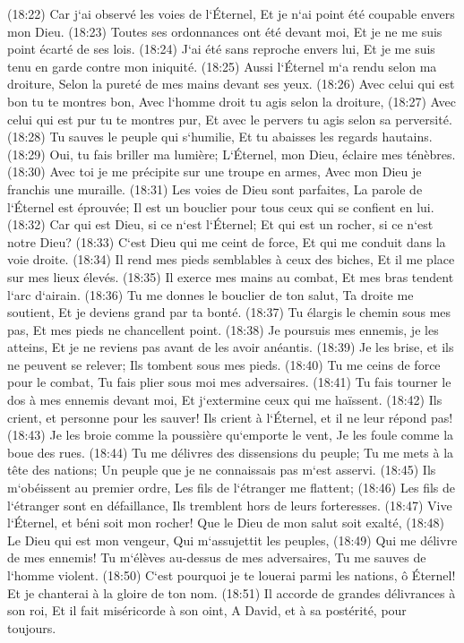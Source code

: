 \verse (18:22) Car j`ai observé les voies de l`Éternel, Et je n`ai point été coupable envers mon Dieu. 
\verse (18:23) Toutes ses ordonnances ont été devant moi, Et je ne me suis point écarté de ses lois. 
\verse (18:24) J`ai été sans reproche envers lui, Et je me suis tenu en garde contre mon iniquité. 
\verse (18:25) Aussi l`Éternel m`a rendu selon ma droiture, Selon la pureté de mes mains devant ses yeux. 
\verse (18:26) Avec celui qui est bon tu te montres bon, Avec l`homme droit tu agis selon la droiture, 
\verse (18:27) Avec celui qui est pur tu te montres pur, Et avec le pervers tu agis selon sa perversité. 
\verse (18:28) Tu sauves le peuple qui s`humilie, Et tu abaisses les regards hautains. 
\verse (18:29) Oui, tu fais briller ma lumière; L`Éternel, mon Dieu, éclaire mes ténèbres. 
\verse (18:30) Avec toi je me précipite sur une troupe en armes, Avec mon Dieu je franchis une muraille. 
\verse (18:31) Les voies de Dieu sont parfaites, La parole de l`Éternel est éprouvée; Il est un bouclier pour tous ceux qui se confient en lui. 
\verse (18:32) Car qui est Dieu, si ce n`est l`Éternel; Et qui est un rocher, si ce n`est notre Dieu? 
\verse (18:33) C`est Dieu qui me ceint de force, Et qui me conduit dans la voie droite. 
\verse (18:34) Il rend mes pieds semblables à ceux des biches, Et il me place sur mes lieux élevés. 
\verse (18:35) Il exerce mes mains au combat, Et mes bras tendent l`arc d`airain. 
\verse (18:36) Tu me donnes le bouclier de ton salut, Ta droite me soutient, Et je deviens grand par ta bonté. 
\verse (18:37) Tu élargis le chemin sous mes pas, Et mes pieds ne chancellent point. 
\verse (18:38) Je poursuis mes ennemis, je les atteins, Et je ne reviens pas avant de les avoir anéantis. 
\verse (18:39) Je les brise, et ils ne peuvent se relever; Ils tombent sous mes pieds. 
\verse (18:40) Tu me ceins de force pour le combat, Tu fais plier sous moi mes adversaires. 
\verse (18:41) Tu fais tourner le dos à mes ennemis devant moi, Et j`extermine ceux qui me haïssent. 
\verse (18:42) Ils crient, et personne pour les sauver! Ils crient à l`Éternel, et il ne leur répond pas! 
\verse (18:43) Je les broie comme la poussière qu`emporte le vent, Je les foule comme la boue des rues. 
\verse (18:44) Tu me délivres des dissensions du peuple; Tu me mets à la tête des nations; Un peuple que je ne connaissais pas m`est asservi. 
\verse (18:45) Ils m`obéissent au premier ordre, Les fils de l`étranger me flattent; 
\verse (18:46) Les fils de l`étranger sont en défaillance, Ils tremblent hors de leurs forteresses. 
\verse (18:47) Vive l`Éternel, et béni soit mon rocher! Que le Dieu de mon salut soit exalté, 
\verse (18:48) Le Dieu qui est mon vengeur, Qui m`assujettit les peuples, 
\verse (18:49) Qui me délivre de mes ennemis! Tu m`élèves au-dessus de mes adversaires, Tu me sauves de l`homme violent. 
\verse (18:50) C`est pourquoi je te louerai parmi les nations, ô Éternel! Et je chanterai à la gloire de ton nom. 
\verse (18:51) Il accorde de grandes délivrances à son roi, Et il fait miséricorde à son oint, A David, et à sa postérité, pour toujours. 

